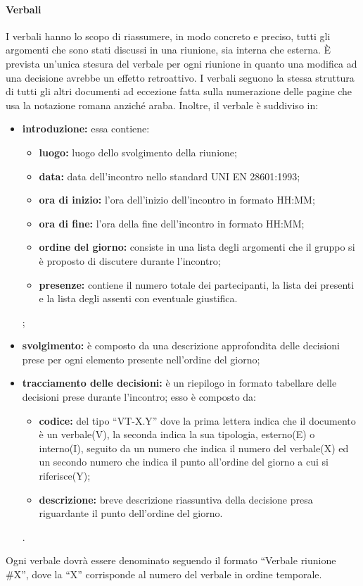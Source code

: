 			\paragraph{Verbali}
				I verbali hanno lo scopo di riassumere, in modo concreto e preciso, tutti gli argomenti che sono stati discussi in una riunione, sia interna che esterna. È prevista un'unica stesura del verbale per ogni riunione in quanto una modifica ad una decisione avrebbe un effetto retroattivo. I verbali seguono la stessa struttura di tutti gli altri documenti ad eccezione fatta sulla numerazione delle pagine che usa la notazione romana anziché araba. Inoltre, il verbale è suddiviso in:
				\begin{itemize}
					\item \textbf{introduzione:} essa contiene:
						\begin{itemize}
							\item \textbf{luogo:} luogo dello svolgimento della riunione;
							\item \textbf{data:} data dell'incontro nello standard UNI EN 28601:1993;
							\item \textbf{ora di inizio:} l'ora dell'inizio dell'incontro in formato HH:MM;
							\item \textbf{ora di fine:} l'ora della fine dell'incontro in formato HH:MM;
							\item \textbf{ordine del giorno:} consiste in una lista degli argomenti che il gruppo si è proposto di discutere durante l'incontro;
							\item \textbf{presenze:} contiene il numero totale dei partecipanti, la lista dei presenti e la lista degli assenti con eventuale giustifica.
						\end{itemize};
					\item \textbf{svolgimento:} è composto da una descrizione approfondita delle decisioni prese per ogni elemento 					presente nell'ordine del giorno;
					\item \textbf{tracciamento delle decisioni:} è un riepilogo in formato tabellare delle decisioni prese durante l'incontro; esso è composto da:
						\begin{itemize}
							\item \textbf{codice:} del tipo ``VT-X.Y'' dove la prima lettera indica che il documento è un verbale(V), la seconda indica la sua tipologia, esterno(E) o interno(I), seguito da un numero che indica il numero del verbale(X) ed un secondo numero che indica il punto all'ordine del giorno a cui si riferisce(Y);
							\item \textbf{descrizione:} breve descrizione riassuntiva della decisione presa riguardante il punto dell'ordine del giorno.
					\end{itemize}.
				\end{itemize}
				Ogni verbale dovrà essere denominato seguendo il formato ``Verbale riunione \#X'', dove la ``X'' corrisponde al numero del verbale in ordine temporale.

